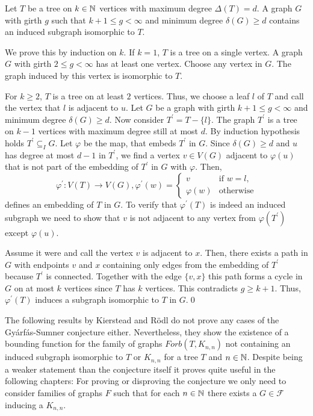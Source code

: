 \begin{thm}
Let $T$ be a tree on $k\in\mathbb{N}$ vertices with maximum degree $\Delta (T)=d$. A graph $G$ with girth $g$ such that $k+1\leq g<\infty$ and minimum degree $\delta (G)\geq d$ contains an induced subgraph isomorphic to $T$.
\end{thm}
\begin{prf}
We prove this by induction on $k$. If $k=1$, $T$ is a tree on a single vertex. A graph $G$ with girth $2\leq g<\infty$ has at least one vertex. Choose any vertex in $G$. The graph induced by this vertex is isomorphic to $T$.

For $k\geq 2$, $T$ is a tree on at least $2$ vertices. Thus, we choose a leaf $l$ of $T$ and call the vertex that $l$ is adjacent to $u$. Let $G$ be a graph with girth $k+1\leq g<\infty$ and minimum degree $\delta (G)\geq d$. Now consider $T^\prime = T-\{l\}$. The graph $T^\prime$ is a tree on $k-1$ vertices with maximum degree still at most $d$. By induction hypothesis holds $T^\prime\subseteq_I G$. Let $\varphi$ be the map, that embeds $T^\prime$ in $G$. Since $\delta (G)\geq d$ and $u$ has degree at most $d-1$ in $T^\prime$, we find a vertex $v\in V(G)$ adjacent to $\varphi (u)$ that is not part of the embedding of $T^\prime$ in $G$ with $\varphi$. Then,
\[\varphi^\prime :V(T)\to V(G), \varphi^\prime (w)=\begin{cases}v&\text{if }w=l,\\ \varphi (w) &\text{otherwise}\end{cases}\]
defines an embedding of $T$ in $G$. To verify that $\varphi^\prime (T)$ is indeed an induced subgraph we need to show that $v$ is not adjacent to any vertex from $\varphi (T^\prime )$ except $\varphi (u)$.

Assume it were and call the vertex $v$ is adjacent to $x$. Then, there exists a path in $G$ with endpoints $v$ and $x$ containing only edges from the embedding of $T^\prime$ because $T^\prime$ is connected. Together with the edge $\{v,x\}$ this path forms a cycle in $G$ on at most $k$ vertices since $T$ has $k$ vertices. This contradicts $g\geq k+1$. Thus, $\varphi^\prime (T)$ induces a subgraph isomorphic to $T$ in $G$.\qed
\end{prf}


The following results by Kierstead and Rödl \cite{Ki96} do not prove any cases of the Gyárfás-Sumner conjecture either. Nevertheless, they show the existence of a bounding function for the family of graphs $\textit{Forb}(T,K_{n,n})$ not containing an induced subgraph isomorphic to $T$ or $K_{n,n}$ for a tree $T$ and $n\in\mathbb{N}$. Despite being a weaker statement than the conjecture itself it proves quite useful in the following chapters: For proving or disproving the conjecture we only need to consider families of graphs $F$ such that for each $n\in\mathbb{N}$ there exists a $G\in\mathcal{F}$ inducing a $K_{n,n}$.

